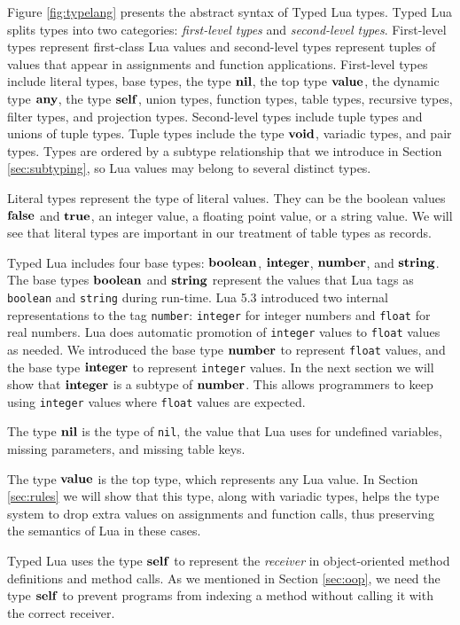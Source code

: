 Figure \ref{fig:typelang} presents the abstract syntax of
Typed Lua types.
Typed Lua splits types into two categories:
\emph{first-level types} and \emph{second-level types}.
First-level types represent first-class Lua values and
second-level types represent tuples of values that appear in 
assignments and function applications.
First-level types include literal types, base types, the type $\mathbf{nil}$,
the top type $\mathbf{value}$, the dynamic type $\mathbf{any}$, the type $\mathbf{self}$,
union types, function types, table types, recursive types,
filter types, and projection types.
Second-level types include tuple types and unions of tuple types.
Tuple types include the type $\mathbf{void}$, variadic types, and pair types.
Types are ordered by a subtype relationship that we introduce
in Section \ref{sec:subtyping}, so Lua values may belong to
several distinct types.

Literal types represent the type of literal values.
They can be the boolean values $\mathbf{false}$ and $\mathbf{true}$,
an integer value, a floating point value, or a string value.
We will see that literal types are important in our treatment of
table types as records.

Typed Lua includes four base types: $\mathbf{boolean}$, $\mathbf{integer}$, $\mathbf{number}$, and $\mathbf{string}$.
The base types $\mathbf{boolean}$ and $\mathbf{string}$ represent the values that
Lua tags as \texttt{boolean} and \texttt{string} during run-time.
Lua 5.3 introduced two internal representations to the tag \texttt{number}:
\texttt{integer} for integer numbers and \texttt{float} for real numbers.
Lua does automatic promotion of \texttt{integer} values to \texttt{float}
values as needed.
We introduced the base type $\mathbf{number}$ to represent \texttt{float} values,
and the base type $\mathbf{integer}$ to represent \texttt{integer} values.
In the next section we will show that $\mathbf{integer}$ is a subtype of $\mathbf{number}$.
This allows programmers to keep using \texttt{integer} values where
\texttt{float} values are expected.

The type $\mathbf{nil}$ is the type of \texttt{nil}, the value that Lua uses for
undefined variables, missing parameters, and missing table keys.

The type $\mathbf{value}$ is the top type, which represents any Lua value.
In Section \ref{sec:rules} we will show that this type,
along with variadic types, helps the type system to drop extra values
on assignments and function calls, thus preserving the
semantics of Lua in these cases.

Typed Lua uses the type $\mathbf{self}$ to represent the \emph{receiver}
in object-oriented method definitions and method calls.
As we mentioned in Section \ref{sec:oop}, we need the type
$\mathbf{self}$ to prevent programs from indexing a method without
calling it with the correct receiver.


